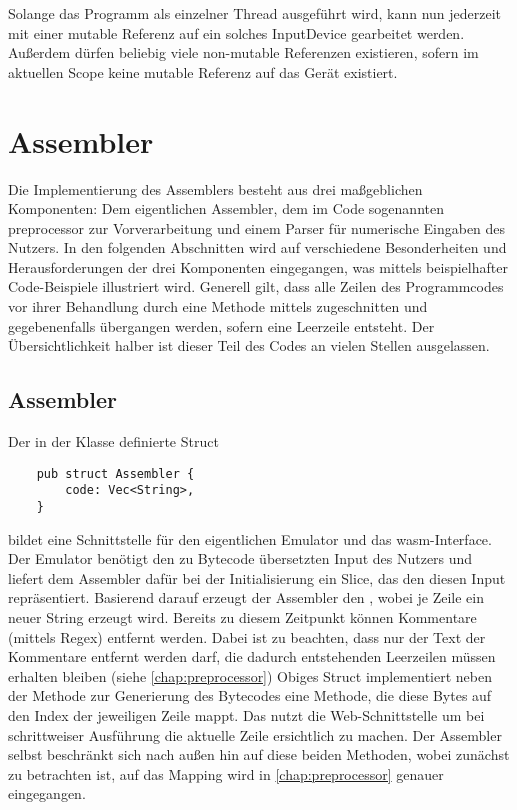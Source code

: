 
Solange das Programm als einzelner Thread ausgeführt wird, kann nun jederzeit mit einer mutable Referenz auf ein solches InputDevice gearbeitet werden. Außerdem dürfen beliebig viele non-mutable Referenzen existieren, sofern im aktuellen Scope keine mutable Referenz auf das Gerät existiert.

\section{Assembler}

Die Implementierung des Assemblers besteht aus drei maßgeblichen Komponenten: Dem eigentlichen Assembler, dem im Code sogenannten \glqq preprocessor\grqq{} zur Vorverarbeitung und einem Parser für numerische Eingaben des Nutzers. In den folgenden Abschnitten wird auf verschiedene Besonderheiten und Herausforderungen der drei Komponenten eingegangen, was mittels beispielhafter Code-Beispiele illustriert wird. Generell gilt, dass alle Zeilen des Programmcodes vor ihrer Behandlung durch eine Methode mittels  zugeschnitten und gegebenenfalls übergangen werden, sofern eine Leerzeile entsteht. Der Übersichtlichkeit halber ist dieser Teil des Codes an vielen Stellen ausgelassen.

\subsection{Assembler}

Der in der Klasse  definierte Struct 
\begin{verbatim}
    pub struct Assembler {
        code: Vec<String>,
    }
\end{verbatim}
bildet eine Schnittstelle für den eigentlichen Emulator und das \ac{wasm}-Interface. Der Emulator benötigt den zu Bytecode übersetzten Input des Nutzers und liefert dem Assembler dafür bei der Initialisierung ein Slice, das den diesen Input repräsentiert. Basierend darauf erzeugt der Assembler den , wobei je Zeile ein neuer String erzeugt wird. Bereits zu diesem Zeitpunkt können Kommentare (mittels Regex) entfernt werden. Dabei ist zu beachten, dass nur der Text der Kommentare entfernt werden darf, die dadurch entstehenden Leerzeilen müssen erhalten bleiben (siehe \ref{chap:preprocessor}) Obiges Struct implementiert neben der Methode  zur Generierung des Bytecodes eine Methode, die diese Bytes auf den Index der jeweiligen Zeile mappt. Das nutzt die Web-Schnittstelle um bei schrittweiser Ausführung die aktuelle Zeile ersichtlich zu machen.
Der Assembler selbst beschränkt sich nach außen hin auf diese beiden Methoden, wobei zunächst  zu betrachten ist, auf das Mapping wird in \ref{chap:preprocessor} genauer eingegangen.

